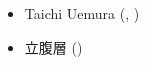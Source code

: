 \documentclass[index]{subfiles}
\begin{document}

\begin{itemize}
\item Taichi Uemura (, )
\item 立腹層 ()
\end{itemize}
\end{document}
